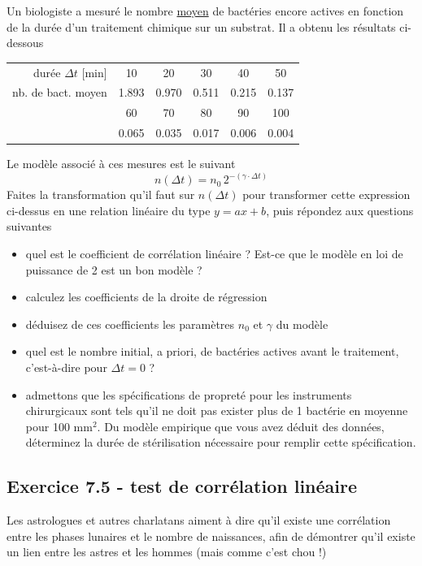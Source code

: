 \documentclass[main.tex]{subfiles}
\begin{document}
Un biologiste a mesuré le nombre \underline{moyen} de bactéries encore actives en fonction de la durée d'un traitement chimique sur un substrat. Il a obtenu les résultats ci-dessous
\begin{center}
    \begin{tabular}{r|ccccc}
        durée $\Delta t$ [min] & 10    & 20    & 30    & 40    & 50    \\
        nb. de bact. moyen     & 1.893 & 0.970 & 0.511 & 0.215 & 0.137 \\
                               & 60    & 70    & 80    & 90    & 100   \\
                               & 0.065 & 0.035 & 0.017 & 0.006 & 0.004
    \end{tabular}
\end{center}
Le modèle associé à ces mesures est le suivant
$$
    n(\Delta t)=n_0\,2^{-(\gamma\cdot\Delta t)}
$$
Faites la transformation qu'il faut sur $n(\Delta t)$ pour transformer cette expression ci-dessus en une relation linéaire du type $y=ax+b$, puis répondez aux questions suivantes
\begin{itemize}
    \item quel est le coefficient de corrélation linéaire ? Est-ce que le modèle en loi de puissance de 2 est un bon modèle ?
    \item calculez les coefficients de la droite de régression
    \item déduisez de ces coefficients les paramètres $n_0$ et $\gamma$ du modèle
    \item quel est le nombre initial, a priori, de bactéries actives avant le traitement, c'est-à-dire pour $\Delta t=0$ ?
    \item admettons que les spécifications de propreté pour les instruments chirurgicaux sont tels qu'il ne doit pas exister plus de 1 bactérie en moyenne pour 100 mm$^2$. Du modèle empirique que vous avez déduit des données, déterminez la durée de stérilisation nécessaire pour remplir cette spécification.
\end{itemize}

\subsection*{Exercice 7.5 - test de corrélation linéaire}

Les astrologues et autres charlatans aiment à dire qu'il existe une corrélation entre les phases lunaires et le nombre de naissances, afin de démontrer qu'il existe un lien entre les astres et les hommes (mais comme c'est chou !)
\end{document}
